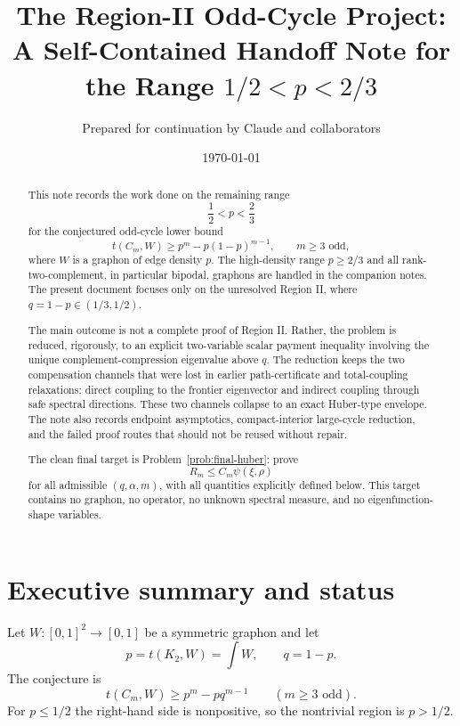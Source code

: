 \documentclass[11pt]{article}
\title{The Region-II Odd-Cycle Project:\\A Self-Contained Handoff Note for the Range $1/2<p<2/3$}
\author{Prepared for continuation by Claude and collaborators}
\date{\today}
\begin{document}
\maketitle

\begin{abstract}
This note records the work done on the remaining range
\[
        \frac12<p<\frac23
\]
for the conjectured odd-cycle lower bound
\[
        t(C_m,W)\ge p^m-p(1-p)^{m-1},
        \qquad m\ge3\text{ odd},
\]
where $W$ is a graphon of edge density $p$.  The high-density range
$p\ge2/3$ and all rank-two-complement, in particular bipodal, graphons
are handled in the companion notes.  The present document focuses only
on the unresolved Region II, where $q=1-p\in(1/3,1/2)$.

The main outcome is not a complete proof of Region II.  Rather, the
problem is reduced, rigorously, to an explicit two-variable scalar
payment inequality involving the unique complement-compression eigenvalue
above $q$.  The reduction keeps the two compensation channels that were
lost in earlier path-certificate and total-coupling relaxations: direct
coupling to the frontier eigenvector and indirect coupling through safe
spectral directions.  These two channels collapse to an exact Huber-type
envelope.  The note also records endpoint asymptotics, compact-interior
large-cycle reduction, and the failed proof routes that should not be
reused without repair.

The clean final target is Problem~\ref{prob:final-huber}: prove
\[
        R_m\le C_m\psi(\xi,\rho)
\]
for all admissible $(q,\alpha,m)$, with all quantities explicitly defined
below.  This target contains no graphon, no operator, no unknown spectral
measure, and no eigenfunction-shape variables.
\end{abstract}

\tableofcontents

\section{Executive summary and status}

Let $W:[0,1]^2\to[0,1]$ be a symmetric graphon and let
\[
        p=t(K_2,W)=\int W,\qquad q=1-p.
\]
The conjecture is
\begin{equation}\label{eq:conj}
        t(C_m,W)\ge p^m-pq^{m-1}
        \qquad (m\ge3\text{ odd}).
\end{equation}
For $p\le1/2$ the right-hand side is nonpositive, so the nontrivial
region is $p>1/2$.
\end{document}
